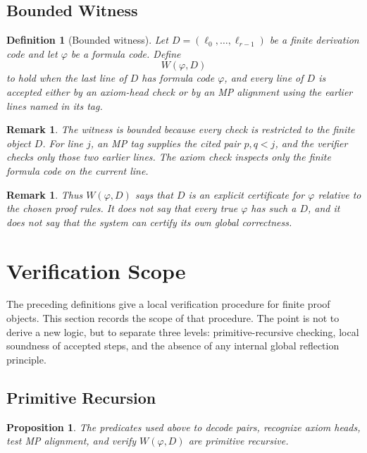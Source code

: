 \documentclass[letterpaper,10pt]{article}
\theoremstyle{upright}
\theoremstyle{upright}
\newtheorem{remark}[theorem]{Remark}
\newtheorem{definition}[theorem]{Definition}
\newtheorem{proposition}[theorem]{Proposition}
\begin{document}
\subsection{Bounded Witness}\label{subsec:bounded-witness}

\begin{definition}[Bounded witness]
	Let $D=(\ell_0,\ldots,\ell_{r-1})$ be a finite derivation code and let $\varphi$ be a formula code. Define
	\begin{equation}
		W(\varphi,D)
	\end{equation}
	to hold when the last line of $D$ has formula code $\varphi$, and every line of $D$ is accepted either by an axiom-head check or by an \textsc{MP} alignment using the earlier lines named in its tag.
\end{definition}

\begin{remark}
	The witness is bounded because every check is restricted to the finite object $D$. For line $j$, an \textsc{MP} tag supplies the cited pair $p,q<j$, and the verifier checks only those two earlier lines. The axiom check inspects only the finite formula code on the current line.
\end{remark}

\begin{remark}
	Thus $W(\varphi,D)$ says that $D$ is an explicit certificate for $\varphi$ relative to the chosen proof rules. It does not say that every true $\varphi$ has such a $D$, and it does not say that the system can certify its own global correctness.
\end{remark}

\section{Verification Scope}\label{sec:verification-scope}

The preceding definitions give a local verification procedure for finite proof objects. This section records the scope of that procedure. The point is not to derive a new logic, but to separate three levels: primitive-recursive checking, local soundness of accepted steps, and the absence of any internal global reflection principle.

\subsection{Primitive Recursion}\label{subsec:primitive-recursion}

\begin{proposition}
	The predicates used above to decode pairs, recognize axiom heads, test \textsc{MP} alignment, and verify $W(\varphi,D)$ are primitive recursive.
\end{proposition}
\end{document}
